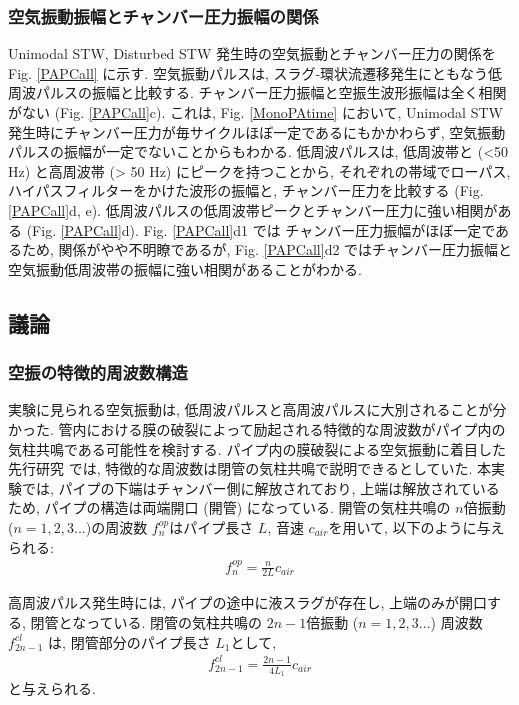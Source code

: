 \documentclass[12pt]{article}
\begin{document}
\clearpage
\subsubsection{空気振動振幅とチャンバー圧力振幅の関係}\label{AcoChp}
 Unimodal STW, Disturbed STW 発生時の空気振動とチャンバー圧力の関係を Fig. \ref{PAPCall} に示す. 空気振動パルスは, スラグ-環状流遷移発生にともなう低周波パルスの振幅と比較する. チャンバー圧力振幅と空振生波形振幅は全く相関がない (Fig. \ref{PAPCall}c). これは, Fig. \ref{MonoPAtime} において, Unimodal STW 発生時にチャンバー圧力が毎サイクルほぼ一定であるにもかかわらず, 空気振動パルスの振幅が一定でないことからもわかる. 低周波パルスは, 低周波帯と (<50 Hz) と高周波帯 (> 50 Hz) にピークを持つことから, それぞれの帯域でローパス, ハイパスフィルターをかけた波形の振幅と, チャンバー圧力を比較する (Fig. \ref{PAPCall}d, e). 低周波パルスの低周波帯ピークとチャンバー圧力に強い相関がある (Fig. \ref{PAPCall}d). Fig. \ref{PAPCall}d1 では チャンバー圧力振幅がほぼ一定であるため, 関係がやや不明瞭であるが, Fig. \ref{PAPCall}d2 ではチャンバー圧力振幅と空気振動低周波帯の振幅に強い相関があることがわかる.

\clearpage
\subsection{議論}\label{ACOdisc}


\subsubsection{空振の特徴的周波数構造}
実験に見られる空気振動は, 低周波パルスと高周波パルスに大別されることが分かった. 管内における膜の破裂によって励起される特徴的な周波数がパイプ内の気柱共鳴である可能性を検討する. パイプ内の膜破裂による空気振動に着目した先行研究 \citep{Vidal2006a, Sanchez2014} では, 特徴的な周波数は閉管の気柱共鳴で説明できるとしていた. 本実験では, パイプの下端はチャンバー側に解放されており, 上端は解放されているため, パイプの構造は両端開口 (開管) になっている. 開管の気柱共鳴の $n$倍振動 ($n=1,2,3...$)の周波数 $f^{op}_{n}$はパイプ長さ $L$, 音速 $c_{air}$を用いて, 以下のように与えられる:
\begin{eqnarray}
f^{op}_{n}=\frac{n}{2L} c_{air}
\end{eqnarray}

高周波パルス発生時には, パイプの途中に液スラグが存在し, 上端のみが開口する, 閉管となっている. 閉管の気柱共鳴の $2n-1$倍振動 ($n=1,2,3...$) 周波数 $f^{cl}_{2n-1}$ は, 閉管部分のパイプ長さ $L_1$として, 
\begin{eqnarray}
f^{cl}_{2n-1}=\frac{2n-1}{4L_1} c_{air}
\end{eqnarray}
と与えられる.
\end{document}
